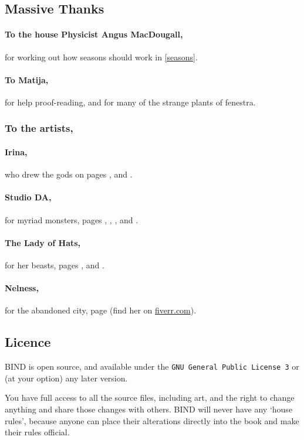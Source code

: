 \begin{multicols}{2}
\columnbreak

\subsection{Massive Thanks}

\paragraph{To the house Physicist Angus MacDougall,}
for working out how seasons should work in \autoref{seasons}.

\paragraph{To Matija,}
for help proof-reading, and for many of the strange plants of \gls{fenestra}.

\subsubsection{To the artists,}
\paragraph{Irina,}
who drew the gods on pages
\pageref{Irina/forest}, 
and
\pageref{Irina/fury}.

\paragraph{Studio DA,}
for myriad monsters,
pages
\pageref{Studio_DA/chitincrawler}, 
\pageref{Studio_DA/woodspy},
\pageref{Studio_DA/ogre},
and
\pageref{Studio_DA/jelly}.

\paragraph{The Lady of Hats,}
for her beasts,
pages
\pageref{loh/dryad}, 
and
\pageref{loh/dragon}.

\paragraph{Nelness,}
for the abandoned city,
page
\pageref{Nelness/city}
(find her on \href{https://www.fiverr.com/nelnes}{fiverr.com}).

\subsection*{Licence}

BIND is open source, and available under the {\tt GNU General Public License 3} or (at your option) any later version.

You have full access to all the source files, including art, and the right to change anything and share those changes with others.
BIND will never have any `house rules', because anyone can place their alterations directly into the book and make their rules official.

\end{multicols}
